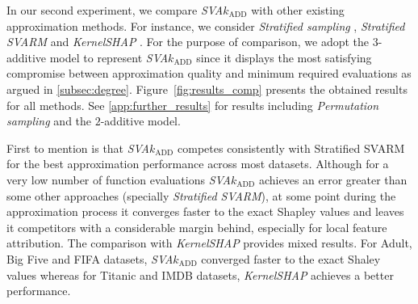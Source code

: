 In our second experiment, we compare \emph{SVA}$k_{\text{ADD}}$ with other existing approximation methods.
For instance, we consider \emph{Stratified sampling} \cite{Maleki.2013}, \emph{Stratified SVARM} \cite{Kolpaczki.2024a} and \emph{KernelSHAP} \citep{Lundberg.2017}.
For the purpose of comparison, we adopt the $3$-additive model to represent \emph{SVA}$k_{\text{ADD}}$ since it displays the most satisfying compromise between approximation quality and minimum required evaluations as argued in \cref{subsec:degree}.
Figure~\ref{fig:results_comp} presents the obtained results for all methods.
See \cref{app:further_results} for results including \emph{Permutation sampling} \cite{Castro.2009} and the $2$-additive model.

First to mention is that \emph{SVA}$k_{\text{ADD}}$ competes consistently with Stratified SVARM for the best approximation performance across most datasets.
Although for a very low number of function evaluations \emph{SVA}$k_{\text{ADD}}$ achieves an error greater than some other approaches (specially \emph{Stratified SVARM}), at some point during the approximation process it converges faster to the exact Shapley values and leaves it competitors with a considerable margin behind, especially for local feature attribution.
The comparison with \emph{KernelSHAP} provides mixed results. 
For Adult, Big Five and FIFA datasets, \emph{SVA}$k_{\text{ADD}}$ converged faster to the exact Shaley values whereas for Titanic and IMDB datasets, \emph{KernelSHAP} achieves a better performance.
